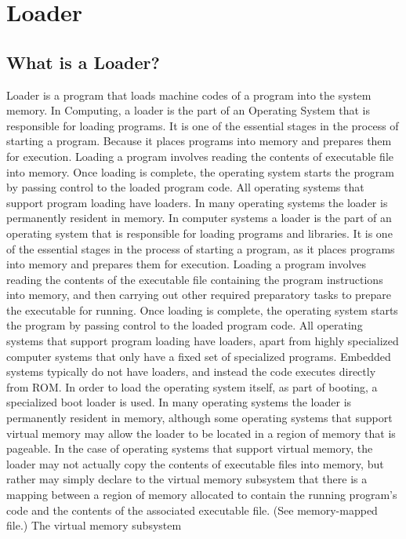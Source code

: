 \documentclass[a4paper,12pt]{extarticle}
\begin{document}
	\section{Loader}
	\subsection{What is a Loader?}
	Loader is a program that loads machine codes of a program into the system memory.
	In Computing, a loader is the part of an Operating System that is responsible
	for loading programs. It is one of the essential stages in the process of starting a
	program. Because it places programs into memory and prepares them for execution.
	Loading a program involves reading the contents of executable file into memory.
	Once loading is complete, the operating system starts the program by passing
	control to the loaded program code. All operating systems that support program
	loading have loaders. In many operating systems the loader is permanently resident
	in memory.
	In computer systems a loader is the part of an operating system that is responsible
	for loading programs and libraries. It is one of the essential stages in the process
	of starting a program, as it places programs into memory and prepares them for
	execution. Loading a program involves reading the contents of the executable file
	containing the program instructions into memory, and then carrying out other required
	preparatory tasks to prepare the executable for running. Once loading is
	complete, the operating system starts the program by passing control to the loaded
	program code.
	All operating systems that support program loading have loaders, apart from highly
	specialized computer systems that only have a fixed set of specialized programs.
	Embedded systems typically do not have loaders, and instead the code executes
	directly from ROM. In order to load the operating system itself, as part of booting,
	a specialized boot loader is used. In many operating systems the loader is permanently
	resident in memory, although some operating systems that support virtual
	memory may allow the loader to be located in a region of memory that is pageable.
	In the case of operating systems that support virtual memory, the loader may not
	actually copy the contents of executable files into memory, but rather may simply
	declare to the virtual memory subsystem that there is a mapping between a region
	of memory allocated to contain the running program’s code and the contents of the
	associated executable file. (See memory-mapped file.) The virtual memory subsystem
\end{document}
